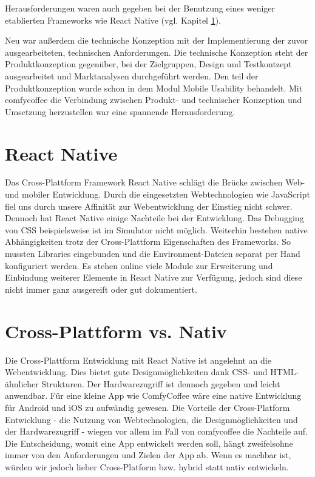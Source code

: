 Herausforderungen waren auch gegeben bei der Benutzung eines weniger etablierten Frameworks wie React Native (vgl. Kapitel \ref{sec:reactnative}).

Neu war außerdem die technische Konzeption mit der Implementierung der zuvor ausgearbeiteten, technischen Anforderungen. Die technische Konzeption steht der Produktkonzeption gegenüber, bei der Zielgruppen, Design und Testkontzept ausgearbeitet und Marktanalysen durchgeführt werden. Den teil der Produktkonzeption wurde schon in dem Modul Mobile Usability behandelt. Mit comfycoffee die Verbindung zwischen Produkt- und technischer Konzeption und Umsetzung herzustellen war eine spannende Herausforderung.

\section{React Native}
\label{sec:reactnative}
Das Cross-Plattform Framework React Native schlägt die Brücke zwischen Web- und mobiler Entwicklung. Durch die eingesetzten Webtechnologien wie JavaScript fiel uns durch unsere Affinität zur Webentwicklung der Einstieg nicht schwer. Dennoch hat React Native einige Nachteile bei der Entwicklung. Das Debugging von CSS beispielsweise ist im Simulator nicht möglich. Weiterhin bestehen native Abhängigkeiten trotz der Cross-Plattform Eigenschaften des Frameworks. So mussten Libraries eingebunden und die Environment-Dateien separat per Hand konfiguriert werden. Es stehen online viele Module zur Erweiterung und Einbindung weiterer Elemente in React Native zur Verfügung, jedoch sind diese nicht immer ganz ausgereift oder gut dokumentiert.

\section{Cross-Plattform vs. Nativ}
Die Cross-Plattform Entwicklung mit React Native ist angelehnt an die Webentwicklung. Dies bietet gute Designmöglichkeiten dank CSS- und HTML-ähnlicher Strukturen. Der Hardwarezugriff ist dennoch gegeben und leicht anwendbar. Für eine kleine App wie ComfyCoffee wäre eine native Entwicklung für Android und iOS zu aufwändig gewesen. Die Vorteile der Cross-Platform Entwicklung - die Nutzung von Webtechnologien, die Designmöglichkeiten und der Hardwarezugriff - wiegen vor allem im Fall von comfycoffee die Nachteile auf. Die Entscheidung, womit eine App entwickelt werden soll, hängt zweifelsohne immer von den Anforderungen und Zielen der App ab. Wenn es machbar ist, würden wir jedoch lieber Cross-Platform bzw. hybrid statt nativ entwickeln.